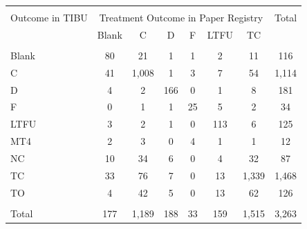 \scriptsize{
\begin{tabular}{l|cccccc|c}
\hline \hline \\[-8pt]
\rowcolor{yellow!15} Outcome in TIBU & \multicolumn{6}{c}{Treatment Outcome in Paper Registry} & Total\\
\rowcolor{yellow!15} &         Blank &           C   &       D  &        F  &     LTFU  &       TC &    \\ \hline \\[-8pt]
Blank & 80 & 21 & 1 & 1 & 2 & 11 & 116 \\
C & 41 & 1,008 & 1 & 3 & 7 & 54 & 1,114 \\
D & 4 & 2 & 166 & 0 & 1 & 8 & 181 \\
F & 0 & 1 & 1 & 25 & 5 & 2 & 34 \\
LTFU & 3 & 2 & 1 & 0 & 113 & 6 & 125 \\
MT4 & 2 & 3 & 0 & 4 & 1 & 1 & 12 \\
NC & 10 & 34 & 6 & 0 & 4 & 32 & 87 \\
TC & 33 & 76 & 7 & 0 & 13 & 1,339 & 1,468 \\
TO & 4 & 42 & 5 & 0 & 13 & 62 & 126 \\
\hline \\[-8pt]
Total & 177 & 1,189 & 188 & 33 & 159 & 1,515 & 3,263 \\
\hline \hline
\end{tabular}}